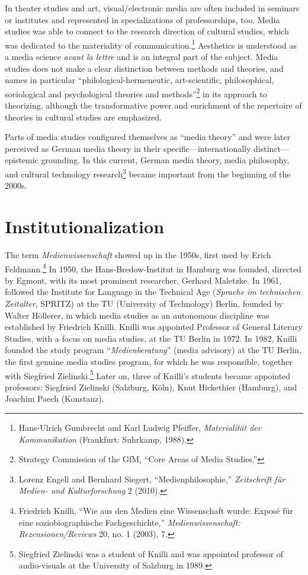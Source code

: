 \documentclass{tufte-handout}
\begin{document}
In theater studies and art, visual/electronic media are often included
in seminars or institutes and represented in specializations of
professorships, too. Media studies was able to connect to the research
direction of cultural studies, which was dedicated to the materiality of
communication.\footnote{Hans-Ulrich Gumbrecht and Karl Ludwig Pfeiffer,
  \emph{Materialität der Kommunikation} (Frankfurt: Suhrkamp, 1988).}
Aesthetics is understood as a media science \emph{avant la lettre} and
is an integral part of the subject. Media studies does not make a clear
distinction between methods and theories, and names in particular
``philological-hermeneutic, art-scientific, philosophical, sociological
and psychological theories and methods''\footnote{Strategy Commission of
  the GfM, ``Core Areas of Media Studies.''} in its approach to
theorizing, although the transformative power and enrichment of the
repertoire of theories in cultural studies are emphasized.

Parts of media studies configured themselves as ``media theory'' and
were later perceived as German media theory in their
specific---internationally distinct---epistemic grounding. In this
current, German media theory, media philosophy, and cultural technology
research\footnote{Lorenz Engell and Bernhard Siegert,
  ``Medienphilosophie,'' \emph{Zeitschrift für Medien- und
  Kulturforschung} 2 (2010).} became important from the beginning of the
2000s.

\hypertarget{institutionalization}{%
\section{\texorpdfstring{Institutionalization
}{Institutionalization }}\label{institutionalization}}

The term \emph{Medienwissenschaft} showed up in the 1950s, first used by
Erich Feldmann.\footnote{Friedrich Knilli, ``Wie aus den Medien eine
  Wissenschaft wurde: Exposé für eine soziobiographische
  Fachgeschichte,'' \emph{Medienwissenschaft: Rezensionen/Reviews} 20,
  no. 1 (2003), 7.} In 1950, the Hans-Bredow-Institut in Hamburg was
founded, directed by Egmont, with its most prominent researcher, Gerhard
Maletzke. In 1961, followed the Institute for Language in the Technical
Age (\emph{Sprache im technischen Zeitalter}, SPRITZ) at the TU
(University of Technology) Berlin, founded by Walter Höllerer, in which
media studies as an autonomous discipline was established by Friedrich
Knilli. Knilli was appointed Professor of General Literary Studies, with
a focus on media studies, at the TU Berlin in 1972. In 1982, Knilli
founded the study program ``\emph{Medienberatung}'' (media advisory) at
the TU Berlin, the first genuine media studies program, for which he was
responsible, together with Siegfried Zielinski.\footnote{Siegfried
  Zielinski was a student of Knilli and was appointed professor of
  audio-visuals at the University of Salzburg in 1989.} Later on, three
of Knilli's students became appointed professors: Siegfried Zielinski
(Salzburg, Köln), Knut Hickethier (Hamburg), and Joachim Paech
(Konstanz).
\end{document}

